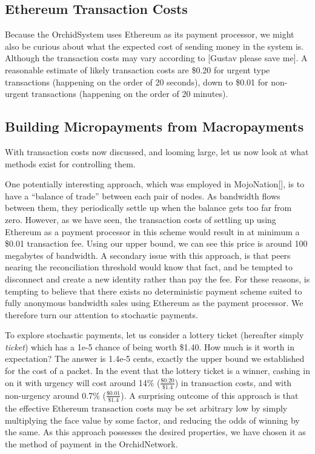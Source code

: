 \documentclass{article}
\newcommand{\orchid}{Orchid}
\newcommand{\Orchid}{\orchid}
\begin{document}
\subsection{Ethereum Transaction Costs}

Because the \Orchid System uses Ethereum as its payment processor, we might also be curious about what the expected cost of sending money in the system is. Although the transaction costs may vary according to [Gustav please save me]. A reasonable estimate of likely transaction costs are \$0.20 for urgent type transactions (happening on the order of 20 seconds), down to \$0.01 for non-urgent transactions (happening on the order of 20 minutes).

\subsection{Building Micropayments from Macropayments}

With transaction costs now discussed, and looming large, let us now look at what methods exist for controlling them.

One potentially interesting approach, which was employed in MojoNation[], is to have a ``balance of trade'' between each pair of nodes. As bandwidth flows between them, they periodically settle up when the balance gets too far from zero. However, as we have seen, the transaction costs of settling up using Ethereum as a payment processor in this scheme would result in at minimum a \$0.01 transaction fee. Using our upper bound, we can see this price is around 100 megabytes of bandwidth. A secondary issue with this approach, is that peers nearing the reconciliation threshold would know that fact, and be tempted to disconnect and create a new identity rather than pay the fee. For these reasons, is tempting to believe that there exists no deterministic payment scheme suited to fully anonymous bandwidth sales using Ethereum as the payment processor. We therefore turn our attention to stochastic payments.

To explore stochastic payments, let us consider a lottery ticket (hereafter simply \emph{ticket}) which has a 1e-5 chance of being worth \$1.40. How much is it worth in expectation? The answer is 1.4e-5 cents, exactly the upper bound we established for the cost of a packet. In the event that the lottery ticket is a winner, cashing in on it with urgency will cost around 14\% ($\frac{\$0.20}{\$1.4}$) in transaction costs, and with non-urgency around 0.7\% ($\frac{\$0.01}{\$1.4}$). A surprising outcome of this approach is that the effective Ethereum transaction costs may be set arbitrary low by simply multiplying the face value by some factor, and reducing the odds of winning by the same. As this approach possesses the desired properties, we have chosen it as the method of payment in the \Orchid Network.
\end{document}

